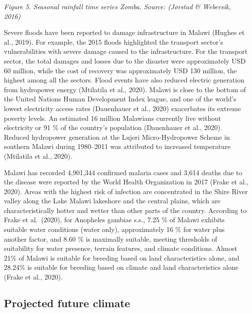 \documentclass[
]{book}
\begin{document}
\emph{Figure 5. Seasonal rainfall time series Zomba. Source: (Jørstad \& Webersik, 2016)}

Severe floods have been reported to damage infrastructure in Malawi (Hughes et al., 2019). For example, the 2015 floods highlighted the transport sector's
vulnerabilities with severe damage caused to the infrastructure. For the transport sector, the total damages and losses due to the disaster were approximately
USD 60 million, while the cost of recovery was approximately USD 130 million, the highest among all the sectors. Flood events have also reduced electric
generation from hydropower energy (Mtilatila et al., 2020). Malawi is close to the bottom of the United Nations Human Development Index league, and one of the
world's lowest electricity access rates (Dauenhauer et al., 2020) exacerbates its extreme poverty levels. An estimated 16 million Malawians currently live
without electricity or 91 \% of the country's population (Dauenhauer et al., 2020). Reduced hydropower generation at the Lujeri Micro-Hydropower Scheme in
southern Malawi during 1980--2011 was attributed to increased temperature (Mtilatila et al., 2020).

Malawi has recorded 4,901,344 confirmed malaria cases and 3,614 deaths due to the disease were reported by the World Health Organization in 2017 (Frake et al.,
2020). Areas with the highest risk of infection are concentrated in the Shire River valley along the Lake Malawi lakeshore and the central plains, which are
characteristically hotter and wetter than other parts of the country. According to Frake et al.~(2020), for Anopheles gambiae s.s., 7.25 \% of Malawi exhibits
suitable water conditions (water only), approximately 16 \% for water plus another factor, and 8.60 \% is maximally suitable, meeting thresholds of suitability for
water presence, terrain features, and climate conditions. Almost 21\% of Malawi is suitable for breeding based on land characteristics alone, and 28.24\% is
suitable for breeding based on climate and land characteristics alone (Frake et al., 2020).

\hypertarget{projected-future-climate}{%
\subsection{Projected future climate}\label{projected-future-climate}}
\end{document}
